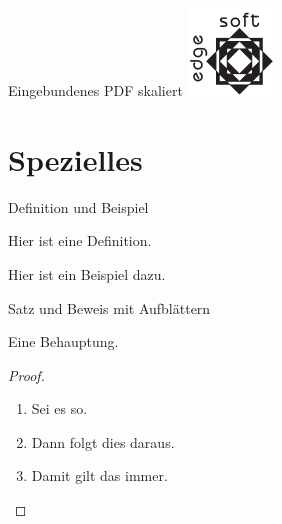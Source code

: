 \documentclass[t, aspectratio=169, ngerman]{beamer}
\begin{document}
	\begin{frame}{Eingebundenes PDF skaliert}
		\includegraphics[width=\textwidth]{testlogo}
	\end{frame}

	\section{Spezielles}

	\begin{frame}{Definition und Beispiel}
		\begin{definition}
			Hier ist eine Definition.
		\end{definition}
		\begin{example}
			Hier ist ein Beispiel dazu.
		\end{example}
	\end{frame}

	\begin{frame}{Satz und Beweis mit Aufblättern}
		\begin{theorem}
			Eine Behauptung.
		\end{theorem}
		\begin{proof}
			\begin{enumerate}
				\item<1-> Sei es so.
				\item<2-> Dann folgt dies daraus.
				\item<1-> Damit gilt das immer.\qedhere
			\end{enumerate}
		\end{proof}
	\end{frame}
\end{document}
